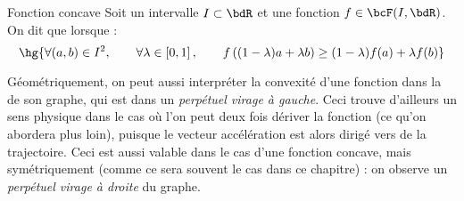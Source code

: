 \documentclass[a4paper,french,bookmarks]{article}
\begin{document}
\begin{definition}{Fonction concave}{}
    Soit un intervalle $I \subset \bdR$ et une fonction $f \in \bcF(I, \bdR)$. On dit que  lorsque :
    \[ \hg{\forall (a, b) \in I^2,\qquad \forall \lambda \in \left[0, 1\right],\qquad f\left((1 - \lambda)a + \lambda b\right) \geq (1-\lambda)f(a) + \lambda f(b)}\]
\end{definition}

Géométriquement, on peut aussi interpréter la convexité d'une fonction dans la  de son graphe, qui est dans un \textit{perpétuel virage à gauche}. Ceci trouve d'ailleurs un sens physique dans le cas où l'on peut deux fois dériver la fonction (ce qu'on abordera plus loin), puisque le vecteur accélération est alors dirigé vers  de la trajectoire. Ceci est aussi valable dans le cas d'une fonction concave, mais symétriquement (comme ce sera souvent le cas dans ce chapitre) : on observe un \textit{perpétuel virage à droite} du graphe.
\end{document}
